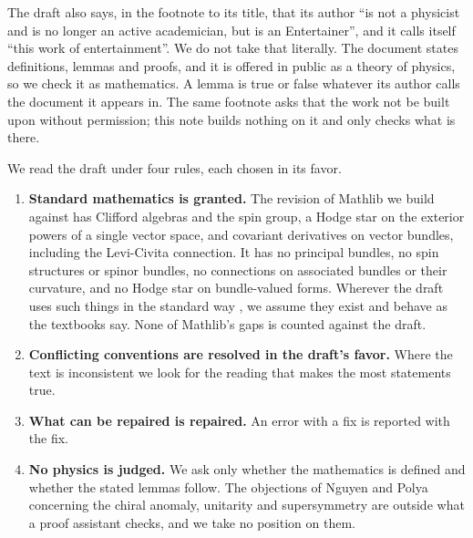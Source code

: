 \documentclass[11pt]{article}
\theoremstyle{remark}
\begin{document}
The draft also says, in the footnote to its title, that its author ``is not a physicist and is
no longer an active academician, but is an Entertainer'', and it calls itself ``this work of
entertainment''. We do not take that literally. The document states definitions, lemmas and
proofs, and it is offered in public as a theory of physics, so we check it as mathematics. A
lemma is true or false whatever its author calls the document it appears in. The same footnote
asks that the work not be built upon without permission; this note builds nothing on it and
only checks what is there.

We read the draft under four rules, each chosen in its favor.

\begin{enumerate}
\item \textbf{Standard mathematics is granted.} The revision of Mathlib we build against has
Clifford algebras and the spin group, a Hodge star on the exterior powers of a single vector
space, and covariant derivatives on vector bundles, including the Levi-Civita connection. It has
no principal bundles, no spin structures or spinor bundles, no connections on associated
bundles or their curvature, and no Hodge star on bundle-valued forms. Wherever the draft uses
such things in the standard way \cite{KN,LM}, we assume they exist and behave as the textbooks
say. None of
Mathlib's gaps is counted against the draft.
\item \textbf{Conflicting conventions are resolved in the draft's favor.} Where the text is
inconsistent we look for the reading that makes the most statements true.
\item \textbf{What can be repaired is repaired.} An error with a fix is reported with the fix.
\item \textbf{No physics is judged.} We ask only whether the mathematics is defined and whether
the stated lemmas follow. The objections of Nguyen and Polya concerning the chiral anomaly,
unitarity and supersymmetry \cite[Sections~3.2 and~3.3]{NP} are outside what a proof assistant
checks, and we take no position on them.
\end{enumerate}
\end{document}
